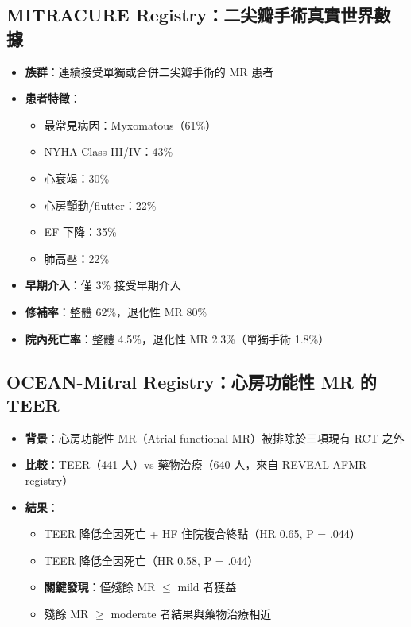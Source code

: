 \documentclass[12pt,a4paper]{article}
\begin{document}
\subsection{MITRACURE Registry：二尖瓣手術真實世界數據}

\begin{itemize}
    \item \textbf{族群}：連續接受單獨或合併二尖瓣手術的 MR 患者
    \item \textbf{患者特徵}：
    \begin{itemize}
        \item 最常見病因：Myxomatous（61\%）
        \item NYHA Class III/IV：43\%
        \item 心衰竭：30\%
        \item 心房顫動/flutter：22\%
        \item EF 下降：35\%
        \item 肺高壓：22\%
    \end{itemize}
    \item \textbf{早期介入}：僅 3\% 接受早期介入
    \item \textbf{修補率}：整體 62\%，退化性 MR 80\%
    \item \textbf{院內死亡率}：整體 4.5\%，退化性 MR 2.3\%（單獨手術 1.8\%）
\end{itemize}


\subsection{OCEAN-Mitral Registry：心房功能性 MR 的 TEER}

\begin{itemize}
    \item \textbf{背景}：心房功能性 MR（Atrial functional MR）被排除於三項現有 RCT 之外
    \item \textbf{比較}：TEER（441 人）vs 藥物治療（640 人，來自 REVEAL-AFMR registry）
    \item \textbf{結果}：
    \begin{itemize}
        \item TEER 降低全因死亡 + HF 住院複合終點（HR 0.65, P = .044）
        \item TEER 降低全因死亡（HR 0.58, P = .044）
        \item \textbf{關鍵發現}：僅殘餘 MR $\leq$ mild 者獲益
        \item 殘餘 MR $\geq$ moderate 者結果與藥物治療相近
    \end{itemize}
\end{itemize}
\end{document}
